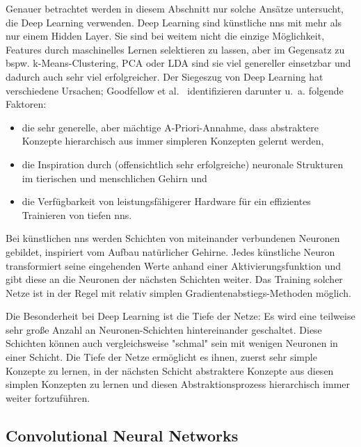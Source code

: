 Genauer betrachtet werden in diesem Abschnitt nur solche Ansätze untersucht, die Deep Learning verwenden.
Deep Learning sind künstliche \glspl{nn} mit mehr als nur einem Hidden Layer.
Sie sind bei weitem nicht die einzige Möglichkeit, Features durch maschinelles Lernen selektieren zu lassen, aber im Gegensatz zu bspw. k-Means-Clustering, PCA oder LDA sind sie viel genereller einsetzbar und dadurch auch sehr viel erfolgreicher.
Der Siegeszug von Deep Learning hat verschiedene Ursachen; Goodfellow et al.~\cite{Goodfellow.2016} identifizieren darunter u.~a. folgende Faktoren:

\begin{itemize}
	\item die sehr generelle, aber mächtige A-Priori-Annahme, dass abstraktere Konzepte hierarchisch aus immer simpleren Konzepten gelernt werden,
	\item die Inspiration durch (offensichtlich sehr erfolgreiche) neuronale Strukturen im tierischen und menschlichen Gehirn und
	\item die Verfügbarkeit von leistungsfähigerer Hardware für ein effizientes Trainieren von tiefen \glspl{nn}.
\end{itemize}

Bei künstlichen \glspl{nn} werden Schichten von miteinander verbundenen Neuronen gebildet, inspiriert vom Aufbau natürlicher Gehirne.
Jedes künstliche Neuron transformiert seine eingehenden Werte anhand einer Aktivierungsfunktion und gibt diese an die Neuronen der nächsten Schichten weiter.
Das Training solcher Netze ist in der Regel mit relativ simplen Gradientenabstiegs-Methoden möglich.

Die Besonderheit bei Deep Learning ist die Tiefe der Netze:
Es wird eine teilweise sehr große Anzahl an Neuronen-Schichten hintereinander geschaltet.
Diese Schichten können auch vergleichsweise "schmal" sein mit wenigen Neuronen in einer Schicht.
Die Tiefe der Netze ermöglicht es ihnen, zuerst sehr simple Konzepte zu lernen, in der nächsten Schicht abstraktere Konzepte aus diesen simplen Konzepten zu lernen und diesen Abstraktionsprozess hierarchisch immer weiter fortzuführen.

\subsection{Convolutional Neural Networks}


